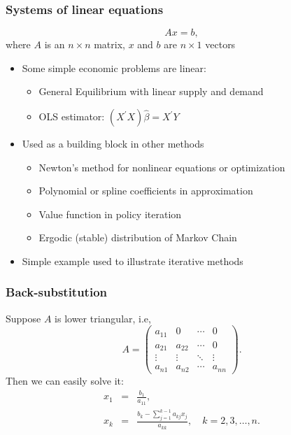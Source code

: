 \documentclass[bigger]{beamer}
\begin{document}
\begin{frame}%
\frametitle{Systems of linear equations}

\begin{equation*}
Ax=b,
\end{equation*}%
where $A$ is an $n\times n$ matrix, $x$ and $b$ are $n\times 1$
vectors\bigskip

\begin{itemize}
\item Some simple economic problems are linear:

\begin{itemize}
\item General Equilibrium with linear supply and demand

\item OLS estimator: $\left( X^{\prime }X\right) \hat{\beta}=X^{\prime }Y$
\end{itemize}

\item Used as a building block in other methods

\begin{itemize}
\item Newton's method for nonlinear equations or optimization

\item Polynomial or spline coefficients in approximation

\item Value function in policy iteration

\item Ergodic (stable) distribution of Markov Chain
\end{itemize}

\item Simple example used to illustrate iterative methods
\end{itemize}

\end{frame}%
\begin{frame}%
\frametitle{Back-substitution}

Suppose $A$ is lower triangular, i.e, 
\begin{equation*}
A=\left( 
\begin{array}{cccc}
a_{11} & 0 & \cdots & 0 \\ 
a_{21} & a_{22} & \cdots & 0 \\ 
\vdots & \vdots & \ddots & \vdots \\ 
a_{n1} & a_{n2} & \cdots & a_{nn}%
\end{array}%
\right) .
\end{equation*}%
Then we can easily solve it: 
\begin{eqnarray*}
x_{1} &=&\frac{b_{1}}{a_{11}}, \\
x_{k} &=&\frac{b_{k}-\sum_{j=1}^{k-1}a_{kj}x_{j}}{a_{kk}},\quad k=2,3,\ldots
,n.
\end{eqnarray*}


\end{frame}%
\end{document}
